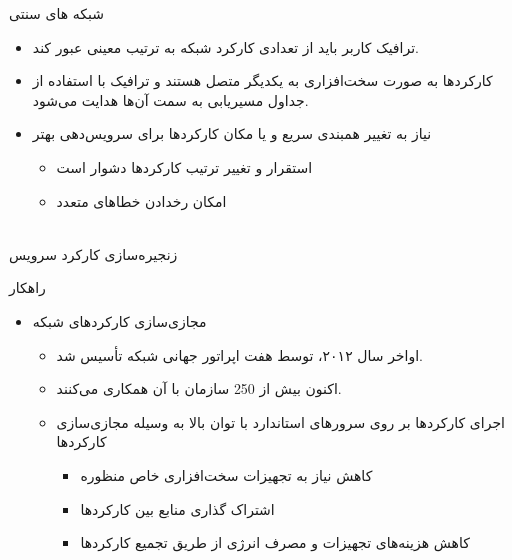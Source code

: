 \documentclass[dvipsnames]{beamer}
\makeatletter
\newcommand{\RTList}{\raggedleft\rightskip\@totalleftmargin}
\makeatother
\begin{document}
\begin{persian}
	\begin{frame}{شبکه های سنتی}
		\begin{itemize}\RTList{}
			\justifying
			\item ترافیک کاربر باید از تعدادی کارکرد شبکه به ترتیب معینی عبور کند.
			\item کارکردها به صورت سخت‌افزاری به یکدیگر متصل هستند و ترافیک با استفاده از جداول مسیریابی به سمت آن‌ها هدایت می‌شود.
			\item نیاز به تغییر همبندی سریع و یا مکان کارکردها برای سرویس‌دهی بهتر
						\begin{itemize}\RTList{}
							\item استقرار و تغییر ترتیب کارکردها دشوار است
							\item امکان رخدادن خطاهای متعدد
						\end{itemize}
		\end{itemize}
		\begin{block}{}
			\centering
			\\
			زنجیره‌سازی کارکرد سرویس
		\end{block}
	\end{frame}

	\begin{frame}{راهکار }
		\begin{itemize}\RTList{}
			\justifying
			\item مجازی‌سازی کارکردهای شبکه
						\begin{itemize}\RTList{}
							\item اواخر سال ۲۰۱۲،  توسط هفت اپراتور جهانی شبکه تأسیس شد.
							\item اکنون بیش از 250 سازمان با آن همکاری می‌کنند.
							\item اجرای کارکردها بر روی سرورهای استاندارد با توان بالا به وسیله مجازی‌سازی کارکردها
										\begin{itemize}\RTList{}
											\item کاهش نیاز به تجهیزات سخت‌افزاری خاص منظوره
											\item اشتراک گذاری منابع بین کارکرد‌ها
											\item کاهش هزینه‌های تجهیزات و مصرف انرژی از طریق تجمیع کارکردها
										\end{itemize}
						\end{itemize}
		\end{itemize}
	\end{frame}


\end{persian}
\end{document}
